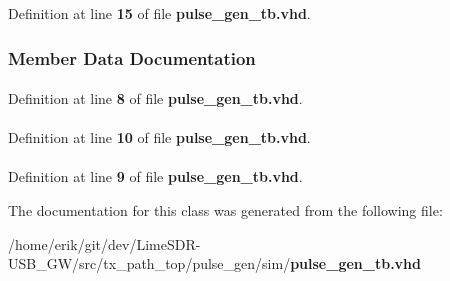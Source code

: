 Definition at line {\bf 15} of file {\bf pulse\+\_\+gen\+\_\+tb.\+vhd}.



\subsubsection{Member Data Documentation}
\paragraph[{ieee}]{\hspace{0.3cm}{\ttfamily [Library]}}\label{classpulse__gen__tb_a0a6af6eef40212dbaf130d57ce711256}


Definition at line {\bf 8} of file {\bf pulse\+\_\+gen\+\_\+tb.\+vhd}.

\paragraph[{numeric\+\_\+std}]{\hspace{0.3cm}{\ttfamily [Package]}}\label{classpulse__gen__tb_a2edc34402b573437d5f25fa90ba4013e}


Definition at line {\bf 10} of file {\bf pulse\+\_\+gen\+\_\+tb.\+vhd}.

\paragraph[{std\+\_\+logic\+\_\+1164}]{\hspace{0.3cm}{\ttfamily [Package]}}\label{classpulse__gen__tb_acd03516902501cd1c7296a98e22c6fcb}


Definition at line {\bf 9} of file {\bf pulse\+\_\+gen\+\_\+tb.\+vhd}.



The documentation for this class was generated from the following file\+:\begin{DoxyCompactItemize}
\item 
/home/erik/git/dev/\+Lime\+S\+D\+R-\/\+U\+S\+B\+\_\+\+G\+W/src/tx\+\_\+path\+\_\+top/pulse\+\_\+gen/sim/{\bf pulse\+\_\+gen\+\_\+tb.\+vhd}\end{DoxyCompactItemize}
